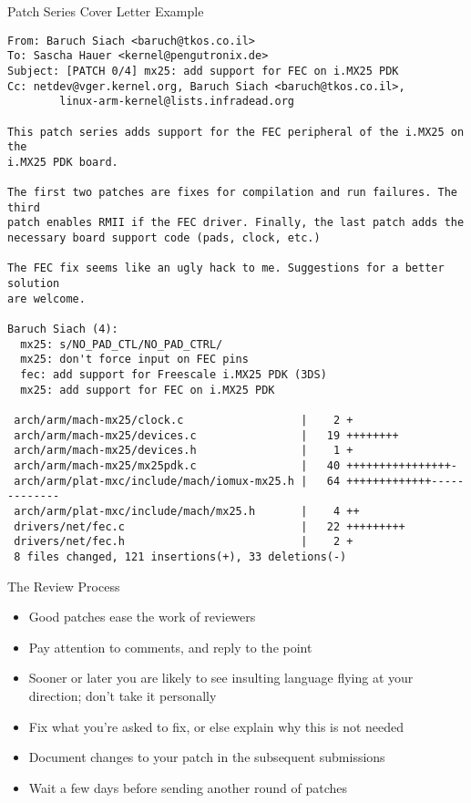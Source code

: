 \documentclass{beamer}
\begin{document}
\begin{frame}[fragile]{Patch Series Cover Letter Example}
  \begin{Verbatim}[fontsize=\tiny]
From: Baruch Siach <baruch@tkos.co.il>
To: Sascha Hauer <kernel@pengutronix.de>
Subject: [PATCH 0/4] mx25: add support for FEC on i.MX25 PDK
Cc: netdev@vger.kernel.org, Baruch Siach <baruch@tkos.co.il>,
        linux-arm-kernel@lists.infradead.org

This patch series adds support for the FEC peripheral of the i.MX25 on the 
i.MX25 PDK board.

The first two patches are fixes for compilation and run failures. The third 
patch enables RMII if the FEC driver. Finally, the last patch adds the 
necessary board support code (pads, clock, etc.)

The FEC fix seems like an ugly hack to me. Suggestions for a better solution 
are welcome.

Baruch Siach (4):
  mx25: s/NO_PAD_CTL/NO_PAD_CTRL/
  mx25: don't force input on FEC pins
  fec: add support for Freescale i.MX25 PDK (3DS)
  mx25: add support for FEC on i.MX25 PDK

 arch/arm/mach-mx25/clock.c                  |    2 +
 arch/arm/mach-mx25/devices.c                |   19 ++++++++
 arch/arm/mach-mx25/devices.h                |    1 +
 arch/arm/mach-mx25/mx25pdk.c                |   40 ++++++++++++++++-
 arch/arm/plat-mxc/include/mach/iomux-mx25.h |   64 +++++++++++++-------------
 arch/arm/plat-mxc/include/mach/mx25.h       |    4 ++
 drivers/net/fec.c                           |   22 +++++++++
 drivers/net/fec.h                           |    2 +
 8 files changed, 121 insertions(+), 33 deletions(-)
  \end{Verbatim}
\end{frame}

\begin{frame}{The Review Process}
  \begin{itemize}
  \item Good patches ease the work of reviewers
  \item Pay attention to comments, and reply to the point
  \item Sooner or later you are likely to see insulting language
    flying at your direction; don't take it personally
  \item Fix what you're asked to fix, or else explain why this is not
    needed
  \item Document changes to your patch in the subsequent submissions
  \item Wait a few days before sending another round of patches
  \end{itemize}
\end{frame}
\end{document}
